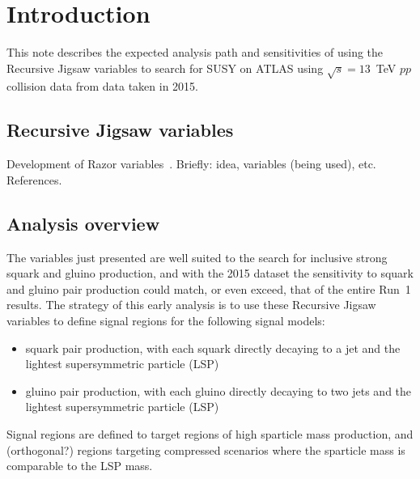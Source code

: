 \section{Introduction}\label{sec:intro}

This note describes the expected analysis path and sensitivities of using the Recursive Jigsaw variables to search for SUSY on ATLAS using $\sqrt{s} = 13$~TeV $pp$ collision data from data taken in 2015.




\subsection{Recursive Jigsaw variables}\label{subsec:RJ}
Development of Razor variables~\cite{bib:Crogan}.
Briefly: idea, variables (being used), etc. References. 


\subsection{Analysis overview}
The variables just presented are well suited to the search for inclusive strong squark and gluino production, and with the 2015 dataset the sensitivity to squark and gluino pair production could match, or even exceed, that of the entire Run~1 results. 
The strategy of this early analysis is to use these Recursive Jigsaw variables to define signal regions for the following signal models:
\begin{itemize}
\item squark pair production, with each squark directly decaying to a jet and the lightest supersymmetric particle (LSP)
\item gluino pair production, with each gluino directly decaying to two jets and the lightest supersymmetric particle (LSP)
\end{itemize}
Signal regions are defined to target regions of high sparticle mass production, and (orthogonal?) regions targeting compressed scenarios where the sparticle mass is comparable to the LSP mass.




